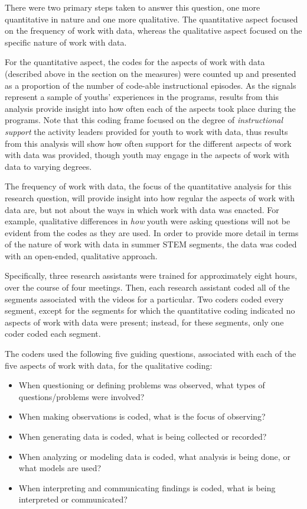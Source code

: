 \documentclass[]{msu-thesis}
\providecommand{\tightlist}{%
  \setlength{\itemsep}{0pt}\setlength{\parskip}{0pt}}
\theoremstyle{definition}
\theoremstyle{definition}
\theoremstyle{definition}
\theoremstyle{remark}
\begin{document}
There were two primary steps taken to answer this question, one more
quantitative in nature and one more qualitative. The quantitative aspect
focused on the frequency of work with data, whereas the qualitative
aspect focused on the specific nature of work with data.

For the quantitative aspect, the codes for the aspects of work with data
(described above in the section on the measures) were counted up and
presented as a proportion of the number of code-able instructional
episodes. As the signals represent a sample of youths' experiences in
the programs, results from this analysis provide insight into how often
each of the aspects took place during the programs. Note that this
coding frame focused on the degree of \emph{instructional support} the
activity leaders provided for youth to work with data, thus results from
this analysis will show how often support for the different aspects of
work with data was provided, though youth may engage in the aspects of
work with data to varying degrees.

The frequency of work with data, the focus of the quantitative analysis
for this research question, will provide insight into how regular the
aspects of work with data are, but not about the ways in which work with
data was enacted. For example, qualitative differences in \emph{how}
youth were asking questions will not be evident from the codes as they
are used. In order to provide more detail in terms of the nature of work
with data in summer STEM segments, the data was coded with an
open-ended, qualitative approach.

Specifically, three research assistants were trained for approximately
eight hours, over the course of four meetings. Then, each research
assistant coded all of the segments associated with the videos for a
particular. Two coders coded every segment, except for the segments for
which the quantitative coding indicated no aspects of work with data
were present; instead, for these segments, only one coder coded each
segment.

The coders used the following five guiding questions, associated with
each of the five aspects of work with data, for the qualitative coding:

\begin{itemize}
\tightlist
\item
  When questioning or defining problems was observed, what types of
  questions/problems were involved?
\item
  When making observations is coded, what is the focus of observing?
\item
  When generating data is coded, what is being collected or recorded?
\item
  When analyzing or modeling data is coded, what analysis is being done,
  or what models are used?
\item
  When interpreting and communicating findings is coded, what is being
  interpreted or communicated?
\end{itemize}
\end{document}
